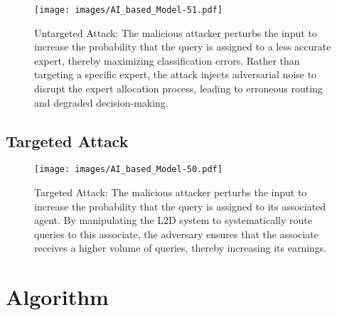 \begin{appendices}
\begin{figure}[H]
    \centering
    \texttt{[image: images/AI\_based\_Model-51.pdf]}
    \caption{Untargeted Attack: The malicious attacker perturbs the input to increase the probability that the query is assigned to a less accurate expert, thereby maximizing classification errors. Rather than targeting a specific expert, the attack injects adversarial noise to disrupt the expert allocation process, leading to erroneous routing and degraded decision-making.}
    \label{fig:untargeted}
\end{figure}

\subsection{Targeted Attack}
\begin{figure}[H]
    \centering
    \texttt{[image: images/AI\_based\_Model-50.pdf]}
    \caption{Targeted Attack: The malicious attacker perturbs the input to increase the probability that the query is assigned to its associated agent. By manipulating the L2D system to systematically route queries to this associate, the adversary ensures that the associate receives a higher volume of queries, thereby increasing its earnings.}
    \label{fig:targeted}
\end{figure}



\section{Algorithm}\label{appendix:algo}


\end{appendices}

